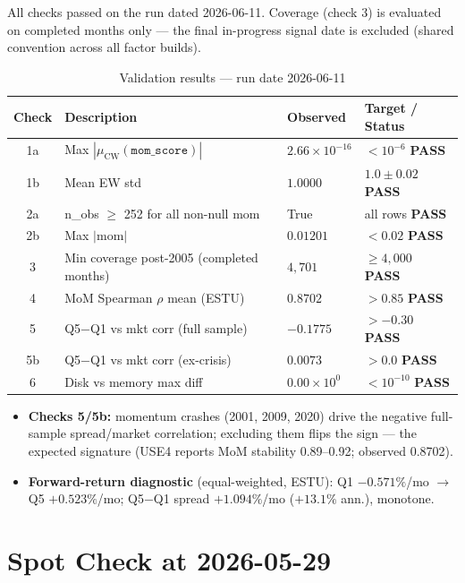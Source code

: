 \documentclass[11pt,a4paper]{article}
\newcommand{\PASS}[1]{\textcolor{pass}{\textbf{#1}}}
\begin{document}
All checks passed on the run dated 2026-06-11. Coverage (check 3) is evaluated
on completed months only --- the final in-progress signal date is excluded
(shared convention across all factor builds).

\begin{table}[h!]
\centering
\caption{Validation results --- run date 2026-06-11}
\small
\begin{tabular}{clll}
\toprule
\textbf{Check} & \textbf{Description} & \textbf{Observed} & \textbf{Target / Status} \\
\midrule
1a & Max $|\mu_{\text{CW}}(\texttt{mom\_score})|$ & $2.66\times10^{-16}$ & $<10^{-6}$ \quad \PASS{PASS} \\
1b & Mean EW std & $1.0000$ & $1.0\pm0.02$ \quad \PASS{PASS} \\
2a & n\_obs $\geq$ 252 for all non-null mom & True & all rows \quad \PASS{PASS} \\
2b & Max $|\text{mom}|$ & $0.01201$ & $<0.02$ \quad \PASS{PASS} \\
3 & Min coverage post-2005 (completed months) & $4{,}701$ & $\geq4{,}000$ \quad \PASS{PASS} \\
4 & MoM Spearman $\rho$ mean (ESTU) & $0.8702$ & $>0.85$ \quad \PASS{PASS} \\
5 & Q5$-$Q1 vs mkt corr (full sample) & $-0.1775$ & $>-0.30$ \quad \PASS{PASS} \\
5b & Q5$-$Q1 vs mkt corr (ex-crisis) & $0.0073$ & $>0.0$ \quad \PASS{PASS} \\
6 & Disk vs memory max diff & $0.00\times10^{0}$ & $<10^{-10}$ \quad \PASS{PASS} \\
\bottomrule
\end{tabular}
\end{table}

\begin{itemize}[leftmargin=*,topsep=2pt,itemsep=2pt]
  \item \textbf{Checks 5/5b:} momentum crashes (2001, 2009, 2020) drive the negative full-sample spread/market correlation; excluding them flips the sign --- the expected signature (USE4 reports MoM stability 0.89--0.92; observed 0.8702).
  \item \textbf{Forward-return diagnostic} (equal-weighted, ESTU): Q1 $-0.571\%$/mo $\to$ Q5 $+0.523\%$/mo; Q5$-$Q1 spread $+1.094\%$/mo ($+13.1\%$ ann.), monotone.
\end{itemize}

\section{Spot Check at 2026-05-29}
\end{document}
